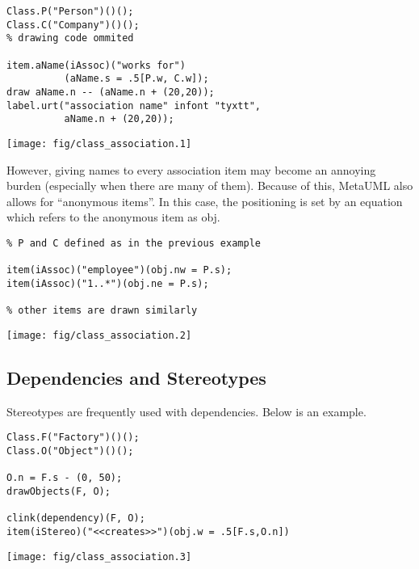 \documentclass{article}
\newcommand{\code}{\ttfamily}
\begin{document}
\begin{multicols}{2}
\begin{verbatim}
Class.P("Person")()();
Class.C("Company")()();
% drawing code ommited

item.aName(iAssoc)("works for")
          (aName.s = .5[P.w, C.w]);
draw aName.n -- (aName.n + (20,20));
label.urt("association name" infont "tyxtt",
          aName.n + (20,20));
\end{verbatim}
\columnbreak
\hspace{1cm}\texttt{[image: fig/class\_association.1]}
\end{multicols}

However, giving names to every association item may become an annoying burden
(especially when there are many of them). Because of this, MetaUML also allows for
``anonymous items''. In this case, the positioning is set by an equation
which refers to the anonymous item as {\code obj}.

\begin{multicols}{2}
\begin{verbatim}
% P and C defined as in the previous example

item(iAssoc)("employee")(obj.nw = P.s);
item(iAssoc)("1..*")(obj.ne = P.s);

% other items are drawn similarly
\end{verbatim}
\columnbreak
\hspace{3cm}\texttt{[image: fig/class\_association.2]}
\end{multicols}

\subsection{Dependencies and Stereotypes}

Stereotypes are frequently used with dependencies. Below is an example.
\pagebreak

\begin{multicols}{2}
\begin{verbatim}
Class.F("Factory")()();
Class.O("Object")()();

O.n = F.s - (0, 50);
drawObjects(F, O);

clink(dependency)(F, O);
item(iStereo)("<<creates>>")(obj.w = .5[F.s,O.n])
\end{verbatim}
\columnbreak
\hspace{3cm}\texttt{[image: fig/class\_association.3]}
\end{multicols}
\end{document}
